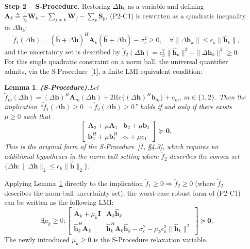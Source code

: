 \documentclass[12pt,a4paper]{article}
\newtheorem{lemma}{Lemma}
\newcommand{\vect}[1]{\mathbf{#1}}
\newcommand{\mat}[1]{\mathbf{#1}}
\newcommand{\Real}{\text{Re}}
\begin{document}
\textbf{Step 2 -- S-Procedure.} Restoring $\Delta\vect{h}_k$ as a variable and defining $\mat{A}_k \triangleq \frac{1}{\gamma_k} \mat{W}_k - \sum_{j \neq k} \mat{W}_j - \sum_{p} \mat{S}_p$, (P2-C1) is rewritten as a quadratic inequality in $\Delta\vect{h}_k$:
\[
\tilde{f}_1(\Delta\vect{h}) = (\hat{\vect{h}} + \Delta\vect{h})^H \mat{A}_k (\hat{\vect{h}} + \Delta\vect{h}) - \sigma_c^2 \geq 0, \quad \forall \|\Delta\vect{h}_k\| \leq \epsilon_h \|\hat{\vect{h}}_k\|,
\]
and the uncertainty set is described by $\tilde{f}_2(\Delta\vect{h}) = \epsilon_h^2 \|\hat{\vect{h}}_k\|^2 - \|\Delta\vect{h}_k\|^2 \geq 0$. For this single quadratic constraint on a norm ball, the universal quantifier admits, via the S-Procedure~[1], a finite LMI equivalent condition:

\begin{lemma}\textbf{(S-Procedure).}\label{lem:s-procedure}
Let $\tilde{f}_m(\Delta\vect{h}) = (\Delta\vect{h})^H \mat{A}_m (\Delta\vect{h}) + 2\Real\{(\Delta\vect{h})^H \vect{b}_m\} + c_m$, $m \in \{1, 2\}$. Then the implication ``$\tilde{f}_1(\Delta\vect{h}) \geq 0 \Rightarrow \tilde{f}_2(\Delta\vect{h}) \geq 0$'' holds \emph{if and only if} there exists $\mu \geq 0$ such that
\[
\begin{bmatrix} \mat{A}_2 + \mu \mat{A}_1 & \vect{b}_2 + \mu \vect{b}_1 \\ \vect{b}_2^H + \mu \vect{b}_1^H & c_2 + \mu c_1 \end{bmatrix} \succeq \mat{0},
\]
This is the original form of the S-Procedure~[1, \S4.3], which requires no additional hypotheses in the norm-ball setting where $\tilde{f}_2$ describes the convex set $\{ \Delta\vect{h} : \|\Delta\vect{h}\|_2 \leq \epsilon_h \|\hat{\vect{h}}\|_2 \}$.
\end{lemma}

Applying Lemma~\ref{lem:s-procedure} directly to the implication $\tilde{f}_1 \geq 0 \Rightarrow \tilde{f}_2 \geq 0$ (where $\tilde{f}_2$ describes the norm-ball uncertainty set), the worst-case robust form of (P2-C1) can be written as the following LMI:
\begin{equation}
\exists \mu_k \geq 0: \begin{bmatrix} \mat{A}_k + \mu_k \mat{I} & \mat{A}_k \hat{\vect{h}}_k \\[1.2ex] \hat{\vect{h}}_k^H \mat{A}_k & \hat{\vect{h}}_k^H \mat{A}_k \hat{\vect{h}}_k - \sigma_c^2 - \mu_k \epsilon_h^2 \|\hat{\vect{h}}_k\|^2 \end{bmatrix} \succeq \mat{0}. \tag{S3.1}
\end{equation}
The newly introduced $\mu_k \geq 0$ is the S-Procedure relaxation variable.
\end{document}
